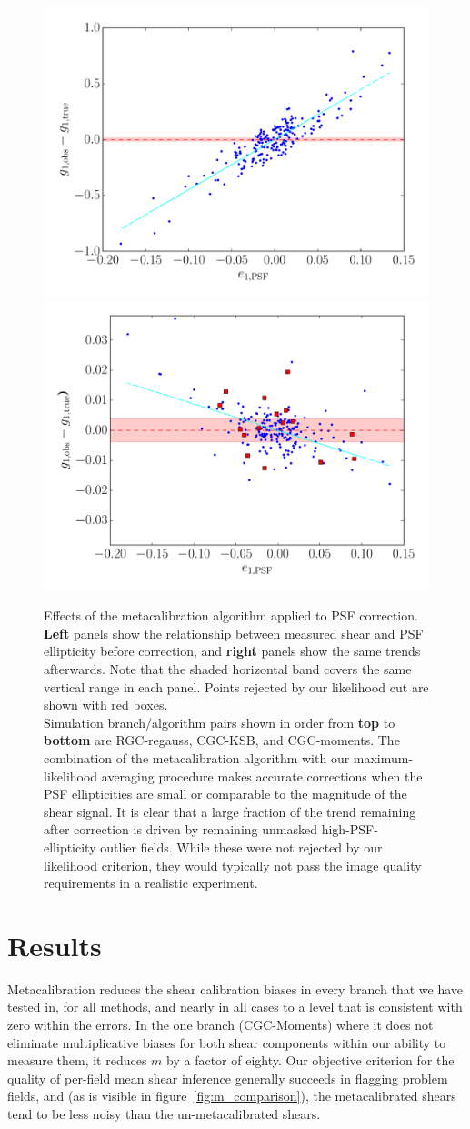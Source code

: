 \documentclass[iop]{emulateapj}
\begin{document}
\begin{figure}
\begin{center}
\includegraphics[width=0.4\linewidth]{psf_e1-no_corrections-moments.pdf}
\includegraphics[width=0.4\linewidth]{psf_e1-moments-opt-shear_plots.pdf}
\end{center}
\caption{Effects of the metacalibration algorithm applied to PSF
  correction. {\bf Left} panels show the relationship between measured
  shear and PSF ellipticity before correction, and {\bf right} panels
  show the same trends afterwards. Note that the shaded horizontal
  band covers the same vertical range in each panel. Points
  rejected by our likelihood cut are shown with red boxes.  \\
  Simulation branch/algorithm pairs shown in order from {\bf top} to
  {\bf bottom} are RGC-regauss, CGC-KSB, and CGC-moments. The
  combination of the metacalibration algorithm with our
  maximum-likelihood averaging procedure makes accurate corrections
  when the PSF ellipticities are small or comparable to the magnitude
  of the shear signal. It is clear that a large fraction of the trend
  remaining after correction is driven by remaining unmasked
  high-PSF-ellipticity outlier fields. While these were not rejected
  by our likelihood criterion, they would typically not pass the image
  quality requirements in a realistic experiment.}
\label{fig:psf_trends}
\end{figure}



\section{Results}
Metacalibration reduces the shear calibration biases in every branch
that we have tested in, for all methods, and nearly in all cases to a level that is consistent with
zero within the errors. In the one branch (CGC-Moments) where it does not
eliminate multiplicative biases for both shear components within our
ability to measure them, it reduces $m$ by a factor of eighty. Our
objective criterion for the quality of per-field mean shear inference
generally succeeds in flagging problem fields, and (as is visible in
figure~\ref{fig:m_comparison}), the metacalibrated shears tend to be
less noisy than the un-metacalibrated shears.
\end{document}
